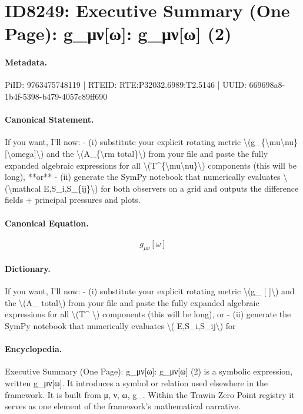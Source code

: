 \section*{ID8249: Executive Summary (One Page): g\_μν[ω]: g\_μν[ω] (2)}
\paragraph{Metadata.}
PiID: 9763475748119 | RTEID: RTE:P32032.6989:T2.5146 | UUID: 669698a8-1b4f-5398-b479-4057c89ff690

\paragraph{Canonical Statement.}
If you want, I’ll now: - (i) substitute your explicit rotating metric \textbackslash{}(g\_\{\textbackslash{}mu\textbackslash{}nu\}[\textbackslash{}omega]\textbackslash{}) and the \textbackslash{}(A\_\{\textbackslash{}rm total\}\textbackslash{}) from your file and paste the fully expanded algebraic expressions for all \textbackslash{}(T\textasciicircum{}\{\textbackslash{}mu\textbackslash{}nu\}\textbackslash{}) components (this will be long), **or** - (ii) generate the SymPy notebook that numerically evaluates \textbackslash{}(\textbackslash{}mathcal E,S\_i,S\_\{ij\}\textbackslash{}) for both observers on a grid and outputs the difference fields + principal pressures and plots.

\paragraph{Canonical Equation.}
\[
g_{\mu\nu}[\omega]
\]

\paragraph{Dictionary.}
If you want, I’ll now: - (i) substitute your explicit rotating metric \textbackslash{}(g\_ [ ]\textbackslash{}) and the \textbackslash{}(A\_ total\textbackslash{}) from your file and paste the fully expanded algebraic expressions for all \textbackslash{}(T\textasciicircum{} \textbackslash{}) components (this will be long), or - (ii) generate the SymPy notebook that numerically evaluates \textbackslash{}( E,S\_i,S\_ij\textbackslash{}) for

\paragraph{Encyclopedia.}
Executive Summary (One Page): g\_μν[ω]: g\_μν[ω] (2) is a symbolic expression, written g\_μν[ω]. It introduces a symbol or relation used elsewhere in the framework. It is built from μ, ν, ω, g\_. Within the Trawin Zero Point registry it serves as one element of the framework's mathematical narrative.
